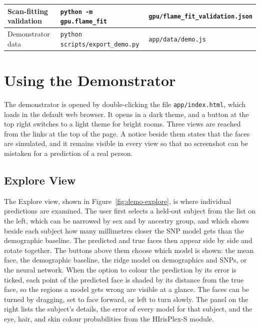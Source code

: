 \begin{table}[!ht]
\begin{tabular}{|P{3.3cm}|P{6.6cm}|P{3.6cm}|}
Scan-fitting validation & \texttt{python -m gpu.flame\_fit} & \texttt{gpu/flame\_fit\_}\newline\texttt{validation.json} \\ \hline
Demonstrator data & \texttt{python scripts/export\_demo.py} & \texttt{app/data/demo.js} \\ \hline
\end{tabular}
\end{table}

\section{Using the Demonstrator}
\label{sec:manual-demo}
The demonstrator is opened by double-clicking the file \texttt{app/index.html}, which loads in the default web browser. It opens in a dark theme, and a button at the top right switches to a light theme for bright rooms. Three views are reached from the links at the top of the page. A notice beside them states that the faces are simulated, and it remains visible in every view so that no screenshot can be mistaken for a prediction of a real person.

\subsection{Explore View}
The Explore view, shown in Figure~\ref{fig:demo-explore}, is where individual predictions are examined. The user first selects a held-out subject from the list on the left, which can be narrowed by sex and by ancestry group, and which shows beside each subject how many millimetres closer the SNP model gets than the demographic baseline. The predicted and true faces then appear side by side and rotate together. The buttons above them choose which model is shown: the mean face, the demographic baseline, the ridge model on demographics and SNPs, or the neural network. When the option to colour the prediction by its error is ticked, each point of the predicted face is shaded by its distance from the true face, so the regions a model gets wrong are visible at a glance. The faces can be turned by dragging, set to face forward, or left to turn slowly. The panel on the right lists the subject's details, the error of every model for that subject, and the eye, hair, and skin colour probabilities from the HIrisPlex-S module.

